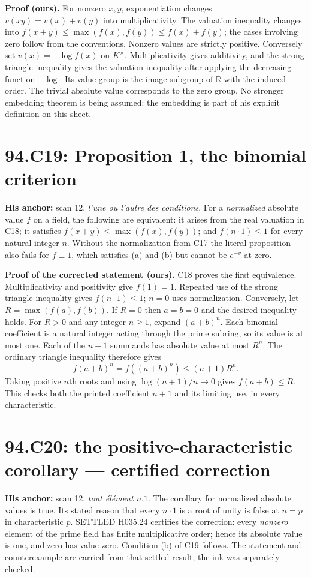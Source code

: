 \documentclass[11pt]{article}
\begin{document}
\textbf{Proof (ours).} For nonzero $x,y$, exponentiation changes
$v(xy)=v(x)+v(y)$ into multiplicativity. The valuation inequality
changes into $f(x+y)\le\max(f(x),f(y))\le f(x)+f(y)$; the cases
involving zero follow from the conventions. Nonzero values are
strictly positive. Conversely set $v(x)=-\log f(x)$ on $K^\times$.
Multiplicativity gives additivity, and the strong triangle inequality
gives the valuation inequality after applying the decreasing function
$-\log$. Its value group is the image subgroup of $\mathbb R$ with
the induced order. The trivial absolute value corresponds to the
zero group. No stronger embedding theorem is being assumed: the
embedding is part of his explicit definition on this sheet.

\section{94.C19: Proposition 1, the binomial criterion}
\label{C19}
\textbf{His anchor:} scan 12, \emph{l'une ou l'autre des conditions}.
For a \emph{normalized} absolute value $f$ on a field, the following
are equivalent: it arises from the real valuation in C18; it satisfies
$f(x+y)\le\max(f(x),f(y))$; and $f(n\cdot1)\le1$ for every natural
integer $n$. Without the normalization from C17 the literal proposition
also fails for $f\equiv1$, which satisfies (a) and (b) but cannot be
$e^{-v}$ at zero.

\textbf{Proof of the corrected statement (ours).} C18 proves the
first equivalence. Multiplicativity and positivity give $f(1)=1$.
Repeated use of the strong triangle inequality gives $f(n\cdot1)\le1$;
$n=0$ uses normalization. Conversely, let $R=\max(f(a),f(b))$.
If $R=0$ then $a=b=0$ and the desired inequality holds. For $R>0$
and any integer $n\ge1$, expand $(a+b)^n$. Each binomial coefficient
is a natural integer acting through the prime subring, so its value
is at most one. Each of the $n+1$ summands has absolute value at most
$R^n$. The ordinary triangle inequality therefore gives
\[
 f(a+b)^n=f((a+b)^n)\le(n+1)R^n.
\]
Taking positive $n$th roots and using
$\log(n+1)/n\to0$ gives $f(a+b)\le R$. This checks both the
printed coefficient $n+1$ and its limiting use, in every characteristic.

\section{94.C20: the positive-characteristic corollary --- certified correction}
\label{C20}
\textbf{His anchor:} scan 12, \emph{tout \'el\'ement $n.1$}.
The corollary for normalized absolute values is true. Its stated reason
that every $n\cdot1$ is a root of unity is false at $n=p$ in
characteristic $p$. SETTLED H035.24 certifies the correction: every
\emph{nonzero} element of the prime field has finite multiplicative
order; hence its absolute value is one, and zero has value zero.
Condition (b) of C19 follows. The statement and counterexample are
carried from that settled result; the ink was separately checked.
\end{document}
